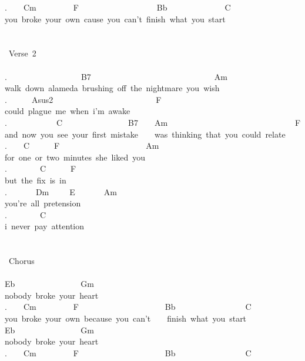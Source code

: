 {.\ \ \ \ Cm\ \ \ \ \ \ \ \ \ F\ \ \ \ \ \ \ \ \ \ \ \ \ \ \ \ \ \ \ Bb\ \ \ \ \ \ \ \ \ \ \ \ \ \ C\\
you\ broke\ your\ own\ cause\ you\ can't\ finish\ what\ you\ start\\
\\
\\
\lbrack\ Verse\ 2\rbrack\\
\\
.\ \ \ \ \ \ \ \ \ \ \ \ \ \ \ \ \ \ B7\ \ \ \ \ \ \ \ \ \ \ \ \ \ \ \ \ \ \ \ \ \ \ \ \ \ \ \ \ \ Am\\
walk\ down\ alameda\ brushing\ off\ the\ nightmare\ you\ wish\\
.\ \ \ \ \ \ Asus2\ \ \ \ \ \ \ \ \ \ \ \ \ \ \ \ \ \ \ \ \ \ \ \ \ F\\
could\ plague\ me\ when\ i'm\ awake\\
.\ \ \ \ \ \ \ \ \ \ \ \ C\ \ \ \ \ \ \ \ \ \ \ \ \ \ \ \ B7\ \ \ \ Am\ \ \ \ \ \ \ \ \ \ \ \ \ \ \ \ \ \ \ \ \ \ \ \ \ \ \ \ \ \ \ F\\
and\ now\ you\ see\ your\ first\ mistake\ \ \ \ was\ thinking\ that\ you\ could\ relate\\
.\ \ \ \ C\ \ \ \ \ \ F\ \ \ \ \ \ \ \ \ \ \ \ \ \ \ \ \ \ \ \ \ Am\\
for\ one\ or\ two\ minutes\ she\ liked\ you\\
.\ \ \ \ \ \ \ \ C\ \ \ \ \ \ F\\
but\ the\ fix\ is\ in\\
.\ \ \ \ \ \ \ Dm\ \ \ \ \ E\ \ \ \ \ \ \ Am\\
you're\ all\ pretension\\
.\ \ \ \ \ \ \ \ C\\
i\ never\ pay\ attention\\
\\
\\
\lbrack\ Chorus\rbrack\\
\\
Eb\ \ \ \ \ \ \ \ \ \ \ \ \ \ \ \ Gm\\
nobody\ broke\ your\ heart\\
.\ \ \ \ Cm\ \ \ \ \ \ \ \ \ F\ \ \ \ \ \ \ \ \ \ \ \ \ \ \ \ \ \ \ \ \ Bb\ \ \ \ \ \ \ \ \ \ \ \ \ \ \ \ \ C\\
you\ broke\ your\ own\ because\ you\ can't\ \ \ \ finish\ what\ you\ start\\
Eb\ \ \ \ \ \ \ \ \ \ \ \ \ \ \ \ Gm\\
nobody\ broke\ your\ heart\\
.\ \ \ \ Cm\ \ \ \ \ \ \ \ \ F\ \ \ \ \ \ \ \ \ \ \ \ \ \ \ \ \ \ \ \ \ Bb\ \ \ \ \ \ \ \ \ \ \ \ \ \ \ \ \ C\\
}
